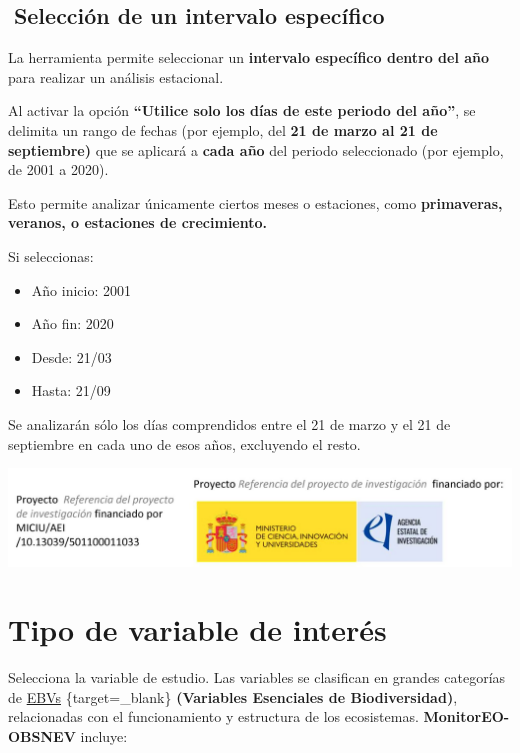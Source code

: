 \documentclass[
]{book}
\providecommand{\tightlist}{%
  \setlength{\itemsep}{0pt}\setlength{\parskip}{0pt}}
\begin{document}
\section{\texorpdfstring{\textbf{📆Selección de un intervalo específico}}{📆Selección de un intervalo específico}}\label{selecciuxf3n-de-un-intervalo-especuxedfico-1}

La herramienta permite seleccionar un \textbf{intervalo específico dentro del año} para realizar un análisis estacional.

Al activar la opción \textbf{``Utilice solo los días de este periodo del año''}, se delimita un rango de fechas (por ejemplo, del \textbf{21 de marzo al 21 de septiembre)} que se aplicará a \textbf{cada año} del periodo seleccionado (por ejemplo, de 2001 a 2020).

Esto permite analizar únicamente ciertos meses o estaciones, como \textbf{primaveras, veranos, o estaciones de crecimiento.}

Si seleccionas:

\begin{itemize}
\tightlist
\item
  Año inicio: 2001\\
\item
  Año fin: 2020\\
\item
  Desde: 21/03\\
\item
  Hasta: 21/09
\end{itemize}

Se analizarán sólo los días comprendidos entre el 21 de marzo y el 21 de septiembre en cada uno de esos años, excluyendo el resto.

\includegraphics{assets/logo.jpeg}

\chapter{Tipo de variable de interés}\label{tipo-variable}

Selecciona la variable de estudio. Las variables se clasifican en grandes categorías de \href{https://geobon.org/ebvs/what-are-ebvs/}{EBVs} \{target=\_blank\} \textbf{(Variables Esenciales de Biodiversidad)}, relacionadas con el funcionamiento y estructura de los ecosistemas. \textbf{MonitorEO-OBSNEV} incluye:
\end{document}
